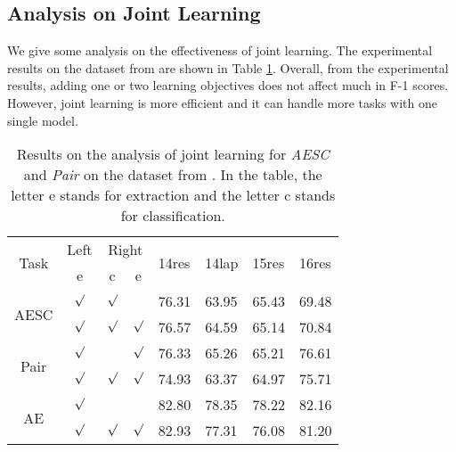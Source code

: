 \documentclass[letterpaper]{article} \usepackage{aaai21}  \usepackage{times}  \usepackage{helvet} \usepackage{courier}  \usepackage[hyphens]{url}  \usepackage{graphicx} \urlstyle{rm} \def\UrlFont{\rm}  \usepackage{natbib}  \usepackage{caption}
\begin{document}
\subsection{Analysis on Joint Learning}
We give some analysis on the effectiveness of joint learning. 
The experimental results on the dataset from \cite{peng2020knowing} are shown in Table \ref{analysis_joint}.
Overall, from the experimental results, adding one or two learning objectives does not affect much in F-1 scores. 
However, joint learning is more efficient and it can handle more tasks with one single model.  

\begin{table}
    \centering
    \small
    \begin{tabular}{c|c|c|c|l|l|l|l}
        \hline
        \multirow{2}{*}{Task}                   & Left  & \multicolumn{2}{c|}{Right} & \multirow{2}{*}{14res} & \multirow{2}{*}{14lap} & \multirow{2}{*}{15res} & \multirow{2}{*}{16res} \\ \cline{2-4}
                              & e & c      & e      &                        &                        &                        &                        \\ \hline
        \multirow{2}{*}{AESC} & $\surd$        & $\surd$            &                & 76.31                  & 63.95                  & 65.43                  & 69.48                  \\ \cline{2-8} 
                              & $\surd$        & $\surd$            & $\surd$             & 76.57           & 64.59           & 65.14         & 70.84         \\ \hline
        \multirow{2}{*}{Pair} & $\surd$        &               & $\surd$             & 76.33                  & 65.26                  & 65.21                  & 76.61                  \\ \cline{2-8} 
                              & $\surd$        & $\surd$            & $\surd$             & 74.93           & 63.37          & 64.97          & 75.71           \\ \hline
        \multirow{2}{*}{AE}   & $\surd$        &               &                & 82.80                  & 78.35                  & 78.22                  & 82.16                  \\ \cline{2-8} 
                              & $\surd$        & $\surd$            & $\surd$             & 82.93           &      77.31                   & 76.08       & 81.20          \\ \hline
        \end{tabular}
    \caption{Results on the analysis of joint learning for \emph{AESC} and \emph{Pair} on the dataset from \cite{peng2020knowing}.
    In the table, the letter e stands for extraction and the letter c stands for classification. } \label{analysis_joint}
    \end{table}
    
\end{document}
